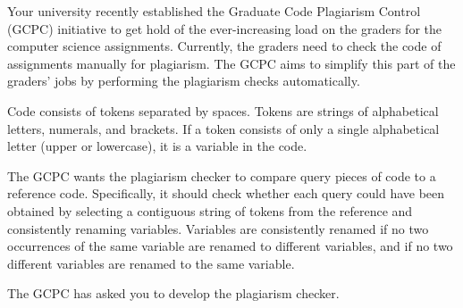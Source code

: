 

%
Your university recently established the Graduate Code Plagiarism Control (GCPC) initiative to get hold of the ever-increasing load on the graders for the computer science assignments.
Currently, the graders need to check the code of assignments manually for plagiarism.
The GCPC aims to simplify this part of the graders' jobs by performing the plagiarism checks automatically.

Code consists of tokens separated by spaces. Tokens are strings of alphabetical letters, numerals, and brackets. If a token consists of only a single alphabetical letter (upper or lowercase), it is a variable in the code.

The GCPC wants the plagiarism checker to compare query pieces of code to a reference code.
Specifically, it should check whether each query could have been obtained by selecting a contiguous
string of tokens from the reference and consistently renaming variables.
Variables are consistently renamed if no two occurrences of the same variable are renamed to different variables,
and if no two different variables are renamed to the same variable.

The GCPC has asked you to develop the plagiarism checker.

